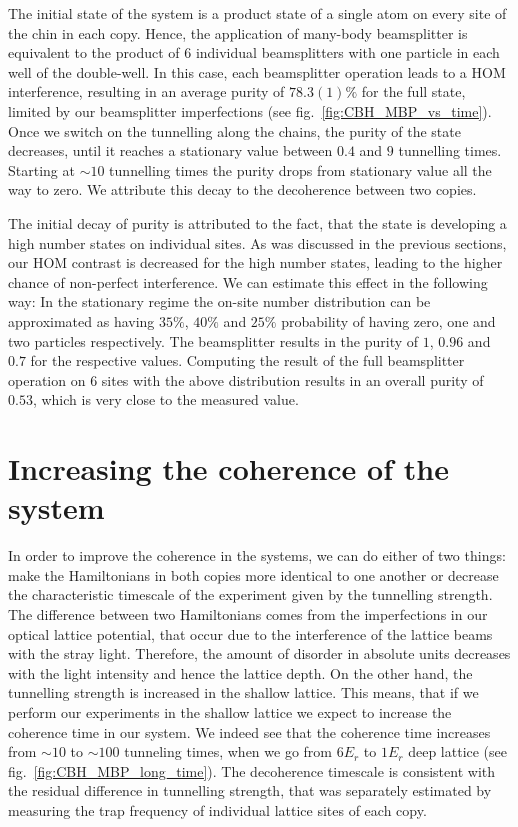 The initial state of the system is a product state of a single atom on every site of the chin in each copy. Hence, the application of many-body beamsplitter is equivalent to the product of $6$ individual beamsplitters with one particle in each well of the double-well. In this case, each beamsplitter operation leads to a HOM interference, resulting in an average purity of $78.3(1)\%$ for the full state, limited by our beamsplitter imperfections (see fig.~\ref{fig:CBH_MBP_vs_time}). Once we switch on the tunnelling along the chains, the purity of the state decreases, until it reaches a stationary value between $0.4$ and $ 9$ tunnelling times. Starting at $\sim 10$ tunnelling times the purity drops from stationary value all the way to zero. We attribute this decay to the decoherence between two copies.

The initial decay of purity is attributed to the fact, that the state is developing a high number states on individual sites. As was discussed in the previous sections, our HOM contrast is decreased for the high number states, leading to the higher chance of non-perfect interference. We can estimate this effect in the following way: In the stationary regime the on-site number distribution can be approximated as having $35\%$, $40\%$ and $25\%$ probability of having zero, one and two particles respectively. The beamsplitter results in the purity of $1$, $0.96$ and $0.7$ for the respective values. Computing the result of the full beamsplitter operation on $6$ sites with the above distribution results in an overall purity of $0.53$, which is very close to the measured value.

\section{Increasing the coherence of the system}
In order to improve the coherence in the systems, we can do either of two things: make the Hamiltonians in both copies more identical to one another or decrease the characteristic timescale of the experiment given by the tunnelling strength. The difference between two Hamiltonians comes from the imperfections in our optical lattice potential, that occur due to the interference of the lattice beams with the stray light. Therefore, the amount of disorder in absolute units decreases with the light intensity and hence the lattice depth. On the other hand, the tunnelling strength is increased in the shallow lattice. This means, that if we perform our experiments in the shallow lattice we expect to increase the coherence time in our system. We indeed see that the coherence time increases from $\sim 10$ to $\sim 100$ tunneling times, when we go from $6 E_r$ to $1 E_r$ deep lattice (see fig.~\ref{fig:CBH_MBP_long_time}). The decoherence timescale is consistent with the residual difference in tunnelling strength, that was separately estimated by measuring the trap frequency of individual lattice sites of each copy. 

